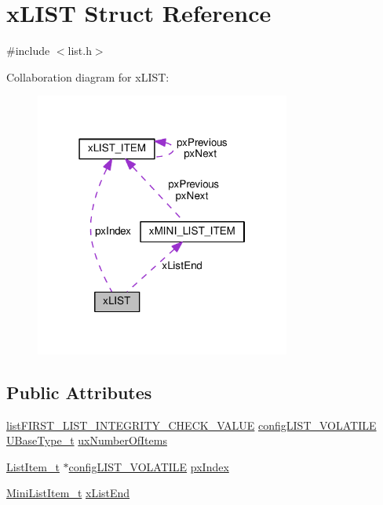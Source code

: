 \hypertarget{structx_l_i_s_t}{}\section{x\+L\+I\+ST Struct Reference}
\label{structx_l_i_s_t}


{\ttfamily \#include $<$list.\+h$>$}



Collaboration diagram for x\+L\+I\+ST\+:\nopagebreak
\begin{figure}[H]
\begin{center}
\leavevmode
\includegraphics[width=238pt]{structx_l_i_s_t__coll__graph}
\end{center}
\end{figure}
\subsection*{Public Attributes}
\begin{DoxyCompactItemize}
\item 
\hyperlink{list_8h_a3a52b5a4f70d3a07e37a5814a23ba880}{list\+F\+I\+R\+S\+T\+\_\+\+L\+I\+S\+T\+\_\+\+I\+N\+T\+E\+G\+R\+I\+T\+Y\+\_\+\+C\+H\+E\+C\+K\+\_\+\+V\+A\+L\+UE} \hyperlink{list_8h_a2d5de557c5561c8980d1bf51d87d8cba}{config\+L\+I\+S\+T\+\_\+\+V\+O\+L\+A\+T\+I\+LE} \hyperlink{portmacro_8h_a646f89d4298e4f5afd522202b11cb2e6}{U\+Base\+Type\+\_\+t} \hyperlink{structx_l_i_s_t_aa5cb7cdc699e1252af0441e46e427a03}{ux\+Number\+Of\+Items}
\item 
\hyperlink{list_8h_a1a62d469392f9bfe2443e7efab9c8398}{List\+Item\+\_\+t} $\ast$\hyperlink{list_8h_a2d5de557c5561c8980d1bf51d87d8cba}{config\+L\+I\+S\+T\+\_\+\+V\+O\+L\+A\+T\+I\+LE} \hyperlink{structx_l_i_s_t_a7bf64d87701493b4c8c5c977682500d7}{px\+Index}
\item 
\hyperlink{list_8h_a542a8d55e98bc407593979e61f83cd02}{Mini\+List\+Item\+\_\+t} \hyperlink{structx_l_i_s_t_a49ad62fa153126e27e273811167b336a}{x\+List\+End}
\end{DoxyCompactItemize}


